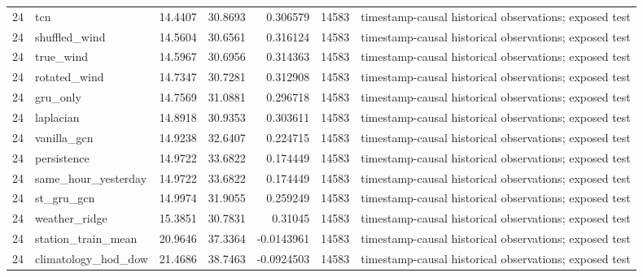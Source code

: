 \begin{tabular}{rlrrrrl}
24 & tcn & 14.4407 & 30.8693 & 0.306579 & 14583 & timestamp-causal historical observations; exposed test \\
24 & shuffled\_wind & 14.5604 & 30.6561 & 0.316124 & 14583 & timestamp-causal historical observations; exposed test \\
24 & true\_wind & 14.5967 & 30.6956 & 0.314363 & 14583 & timestamp-causal historical observations; exposed test \\
24 & rotated\_wind & 14.7347 & 30.7281 & 0.312908 & 14583 & timestamp-causal historical observations; exposed test \\
24 & gru\_only & 14.7569 & 31.0881 & 0.296718 & 14583 & timestamp-causal historical observations; exposed test \\
24 & laplacian & 14.8918 & 30.9353 & 0.303611 & 14583 & timestamp-causal historical observations; exposed test \\
24 & vanilla\_gcn & 14.9238 & 32.6407 & 0.224715 & 14583 & timestamp-causal historical observations; exposed test \\
24 & persistence & 14.9722 & 33.6822 & 0.174449 & 14583 & timestamp-causal historical observations; exposed test \\
24 & same\_hour\_yesterday & 14.9722 & 33.6822 & 0.174449 & 14583 & timestamp-causal historical observations; exposed test \\
24 & st\_gru\_gcn & 14.9974 & 31.9055 & 0.259249 & 14583 & timestamp-causal historical observations; exposed test \\
24 & weather\_ridge & 15.3851 & 30.7831 & 0.31045 & 14583 & timestamp-causal historical observations; exposed test \\
24 & station\_train\_mean & 20.9646 & 37.3364 & -0.0143961 & 14583 & timestamp-causal historical observations; exposed test \\
24 & climatology\_hod\_dow & 21.4686 & 38.7463 & -0.0924503 & 14583 & timestamp-causal historical observations; exposed test \\
\hline
\end{tabular}
